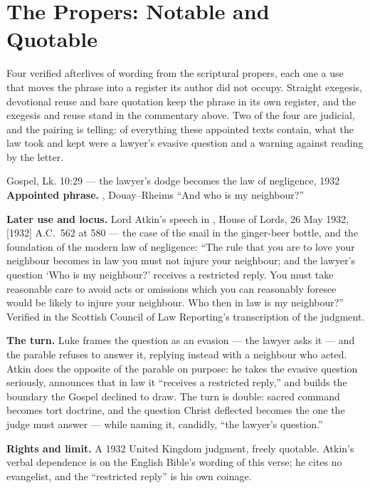 \sectionguard
\section*{The Propers: Notable and Quotable}

Four verified afterlives of wording from the scriptural propers, each one a
use that moves the phrase into a register its author did not occupy. Straight
exegesis, devotional reuse and bare quotation keep the phrase in its own
register, and the exegesis and reuse stand in the commentary above. Two of the
four are judicial, and the pairing is telling: of everything these appointed
texts contain, what the law took and kept were a lawyer's evasive question and
a warning against reading by the letter.

\begin{afterlife}{Gospel, Lk. 10:29 --- the lawyer's dodge becomes the law of negligence, 1932}
\textbf{Appointed phrase.} , Douay--Rheims
``And who is my neighbour?''

\textbf{Later use and locus.} Lord Atkin's speech in , House of Lords, 26 May 1932, [1932] A.C.\ 562 at 580 --- the case
of the snail in the ginger-beer bottle, and the foundation of the modern law
of negligence: ``The rule that you are to love your neighbour becomes in law
you must not injure your neighbour; and the lawyer's question `Who is my
neighbour?' receives a restricted reply. You must take reasonable care to
avoid acts or omissions which you can reasonably foresee would be likely to
injure your neighbour. Who then in law is my neighbour?'' Verified in the
Scottish Council of Law Reporting's transcription of the judgment.

\textbf{The turn.} Luke frames the question as an evasion --- the lawyer asks
it  --- and the parable refuses to answer
it, replying instead with a neighbour who acted. Atkin does the opposite of
the parable on purpose: he takes the evasive question seriously, announces
that in law it ``receives a restricted reply,'' and builds the boundary the
Gospel declined to draw. The turn is double: sacred command becomes tort
doctrine, and the question Christ deflected becomes the one the judge must
answer --- while naming it, candidly, ``the lawyer's question.''

\textbf{Rights and limit.} A 1932 United Kingdom judgment, freely quotable.
Atkin's verbal dependence is on the English Bible's wording of this verse; he
cites no evangelist, and the ``restricted reply'' is his own coinage.
\end{afterlife}

